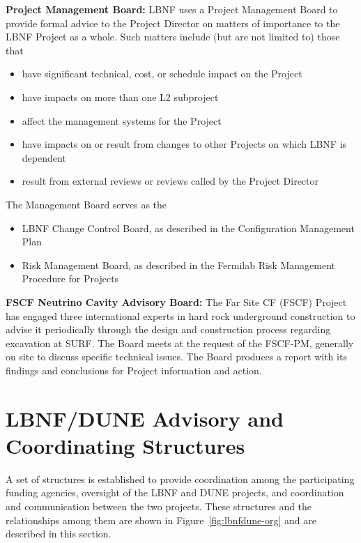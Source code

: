 \textbf{Project Management Board:} LBNF uses a Project Management Board to provide formal advice to the Project Director on matters of importance to the LBNF Project as a whole. Such matters include (but are not limited to) those that
\begin{itemize}
\item have significant technical, cost, or schedule impact on the Project
\item have impacts on more than one L2 subproject
\item affect the management systems for the Project
\item have impacts on or result from changes to other Projects on which LBNF is dependent
\item result from external reviews or reviews called by the Project Director
\end{itemize}

The Management Board serves as the
\begin{itemize}
\item LBNF Change Control Board, as described in the Configuration Management Plan\cite{CMP-10760} 
\item Risk Management Board, as described in the Fermilab Risk Management Procedure for Projects~\cite{fnal-risk-mgmt} %
\end{itemize}

\textbf{FSCF Neutrino Cavity Advisory Board:} The Far Site CF (FSCF) Project has engaged three international experts in hard rock underground construction to advise it periodically through the design and construction process regarding excavation at SURF. The Board meets at the request of the FSCF-PM, generally on site to discuss specific technical issues. The Board produces a report with its findings and conclusions for Project information and action. 

\section{LBNF/DUNE Advisory and Coordinating Structures}
\label{sec:lbnf-dune-interface}


A set of structures is established to provide coordination among the participating funding agencies, oversight of the LBNF and DUNE projects, and coordination and communication between the two projects.  These structures and the relationships among them are shown in Figure~\ref{fig:lbnfdune-org} and are described in this section.

